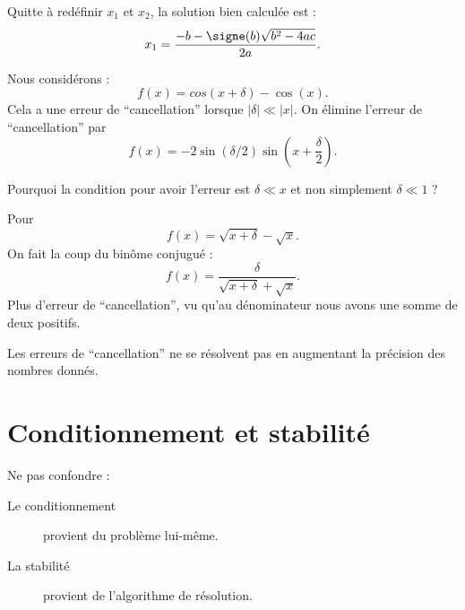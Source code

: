 Quitte à redéfinir \( x_1\) et \( x_2\), la solution bien calculée est :
\begin{equation}
	x_1=\frac{ -b-\signe(b)\sqrt{b^2-4ac} }{ 2a }.
\end{equation}

\begin{example}
	Nous considérons :
	\begin{equation}
		f(x)=cos(x+\delta)-\cos(x).
	\end{equation}
	Cela a une erreur de ``cancellation'' lorsque \( | \delta |\ll | x |\). On élimine l'erreur de ``cancellation'' par
	\begin{equation}
		f(x)=-2\sin(\delta/2)\sin\left( x+\frac{ \delta }{ 2 } \right).
	\end{equation}

	\begin{probleme}
		Pourquoi la condition pour avoir l'erreur est \( \delta\ll x\) et non simplement \( \delta\ll 1\) ?
	\end{probleme}

\end{example}

\begin{example}
	Pour
	\begin{equation}
		f(x)=\sqrt{x+\delta}-\sqrt{x}.
	\end{equation}
	On fait la coup du binôme conjugué :
	\begin{equation}
		f(x)=\frac{ \delta }{ \sqrt{x+\delta}+\sqrt{x} }.
	\end{equation}
	Plus d'erreur de ``cancellation'', vu qu'au dénominateur nous avons une somme de deux positifs.
\end{example}

Les erreurs de ``cancellation'' ne se résolvent pas en augmentant la précision des nombres donnés.

\section{Conditionnement et stabilité}

Ne pas confondre :
\begin{description}
	\item[Le conditionnement] provient du problème lui-même.
	\item[La stabilité] provient de l'algorithme de résolution.
\end{description}

